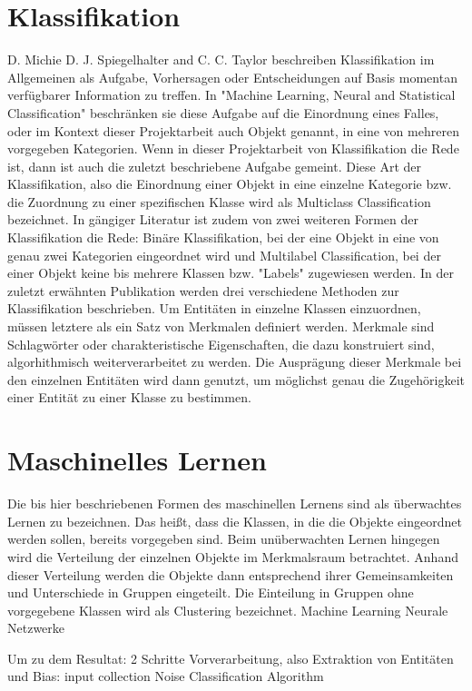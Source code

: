 \section{Klassifikation}
D. Michie  D. J. Spiegelhalter  and C. C. Taylor beschreiben Klassifikation im Allgemeinen als Aufgabe, Vorhersagen oder Entscheidungen auf Basis momentan verfügbarer Information zu treffen. In "Machine Learning, Neural and Statistical Classification" beschränken sie diese Aufgabe auf die Einordnung eines Falles, oder im Kontext dieser Projektarbeit auch Objekt genannt, in eine von mehreren vorgegeben Kategorien. Wenn in dieser Projektarbeit von Klassifikation die Rede ist, dann ist auch die zuletzt beschriebene Aufgabe gemeint. Diese Art der Klassifikation, also die Einordnung einer Objekt in eine einzelne Kategorie bzw. die Zuordnung zu einer spezifischen Klasse wird als Multiclass Classification bezeichnet. In gängiger Literatur ist zudem von zwei weiteren Formen der Klassifikation die Rede: Binäre Klassifikation, bei der eine Objekt in eine von genau zwei Kategorien eingeordnet wird und Multilabel Classification, bei der einer Objekt keine bis mehrere Klassen bzw. "Labels" zugewiesen werden.\cite{michie1994machine}
In der zuletzt erwähnten Publikation werden drei verschiedene Methoden zur Klassifikation beschrieben.
Um Entitäten in einzelne Klassen einzuordnen, müssen letztere als ein Satz von Merkmalen definiert werden. Merkmale sind Schlagwörter oder charakteristische Eigenschaften, die dazu konstruiert sind, algorhithmisch weiterverarbeitet zu werden. \cite{nadeau2007survey} Die Ausprägung dieser Merkmale bei den einzelnen Entitäten wird dann genutzt, um möglichst genau die Zugehörigkeit einer Entität zu einer Klasse zu bestimmen.

\section{Maschinelles Lernen}
Die bis hier beschriebenen Formen des maschinellen Lernens sind als überwachtes Lernen zu bezeichnen. Das heißt, dass die Klassen, in die die Objekte eingeordnet werden sollen, bereits vorgegeben sind. Beim unüberwachten Lernen hingegen wird die Verteilung der einzelnen Objekte im Merkmalsraum betrachtet. Anhand dieser Verteilung werden die Objekte dann entsprechend ihrer Gemeinsamkeiten und Unterschiede in Gruppen eingeteilt. Die Einteilung in Gruppen ohne vorgegebene Klassen wird als Clustering bezeichnet.
Machine Learning
Neurale Netzwerke

\cite{nadeau2007survey}
Um zu dem Resultat: 2 Schritte Vorverarbeitung, also Extraktion von Entitäten und 
Bias: input collection
Noise
Classification Algorithm
